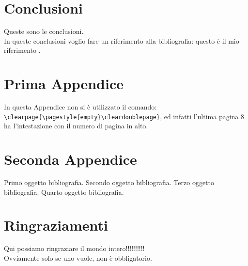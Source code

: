 \documentclass[12pt,a4paper,openright,twoside]{report}
\renewcommand{\chaptermark}[1]{\markboth{\thechapter.\ #1}{}}
\begin{document}
\chapter*{Conclusioni}
 Queste sono le
conclusioni.\\
In queste conclusioni voglio fare un riferimento alla
bibliografia: questo \`e il mio riferimento \cite{K3,K4}.
\renewcommand{\chaptermark}[1]{\markright{\thechapter \ #1}{}}
\lhead[\fancyplain{}{\bfseries\thepage}]{\fancyplain{}{\bfseries\rightmark}}
\appendix                               %
\chapter{Prima Appendice}               %
In questa Appendice non si \`e utilizzato il comando:\\
\verb"\clearpage{\pagestyle{empty}\cleardoublepage}", ed infatti
l'ultima pagina 8 ha l'intestazione con il numero di pagina in
alto.
\chapter{Seconda Appendice}             %
\begin{thebibliography}{90}             %
\rhead[\fancyplain{}{\bfseries \leftmark}]{\fancyplain{}{\bfseries
\thepage}}
 Primo oggetto bibliografia.
 Secondo oggetto bibliografia.
 Terzo oggetto bibliografia.
 Quarto oggetto bibliografia.
\end{thebibliography}
\clearpage{\pagestyle{empty}\cleardoublepage}
\chapter*{Ringraziamenti}
\thispagestyle{empty}
Qui possiamo ringraziare il mondo intero!!!!!!!!!!\\
Ovviamente solo se uno vuole, non \`e obbligatorio.
\end{document}
